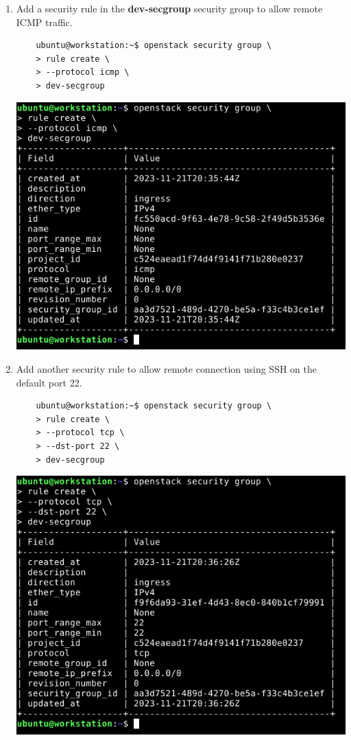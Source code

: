 \documentclass[letterpaper, 12pt]{article}
\begin{document}
\begin{enumerate}
    \item Add a security rule in the \textbf{dev-secgroup} security group to allow remote ICMP traffic.
    \begin{lstlisting}
    ubuntu@workstation:~$ openstack security group \
    > rule create \
    > --protocol icmp \
    > dev-secgroup
    \end{lstlisting}

    \begin{center}
        \includegraphics[width=\linewidth]{images/part4/step18.png}
    \end{center}

    \item Add another security rule to allow remote connection using SSH on the default port 22.
    \begin{lstlisting}
    ubuntu@workstation:~$ openstack security group \
    > rule create \
    > --protocol tcp \
    > --dst-port 22 \
    > dev-secgroup
    \end{lstlisting}

    \begin{center}
        \includegraphics[width=\linewidth]{images/part4/step19.png}
    \end{center}


\end{enumerate}
\end{document}
